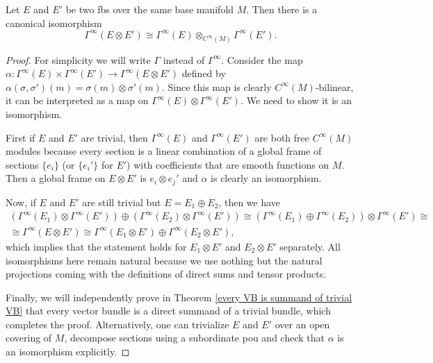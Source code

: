 \begin{prop}\label{sections of tensor products}
    Let $E$ and $E'$ be two \glspl{fb} over the same base manifold $M$. Then there is a canonical isomorphism
    \[\Gamma^\infty(E\otimes E')\cong \Gamma^\infty(E)\otimes_{C^\infty(M)}\Gamma^\infty(E').\]
\end{prop}
\begin{proof}
    For simplicity we will write $\Gamma$ instead of $\Gamma^\infty$. Consider the map $\alpha:\Gamma^\infty(E)\times\Gamma^\infty(E')\to\Gamma^\infty(E\otimes E')$ defined by $\alpha(\sigma,\sigma')(m)=\sigma(m)\otimes\sigma'(m)$. Since this map is clearly $C^\infty(M)$-bilinear, it can be interpreted as a map on $\Gamma^\infty(E)\otimes\Gamma^\infty(E')$. We need to show it is an isomorphism.
    
    First if $E$ and $E'$ are trivial, then $\Gamma^\infty(E)$ and $\Gamma^\infty(E')$ are both free $C^\infty(M)$ modules because every section is a linear combination of a global frame of sections $\{e_i\}$ (or $\{e_i'\}$ for $E'$) with coefficients that are smooth functions on $M$. Then a global frame on $E\otimes E'$ is $e_i\otimes e_j'$ and $\alpha$ is clearly an isomorphism.
    
    Now, if $E$ and $E'$ are still trivial but $E=E_1\oplus E_2$, then we have 
    \begin{multline}
        (\Gamma^\infty(E_1)\otimes\Gamma^\infty(E'))\oplus(\Gamma^\infty(E_2)\otimes\Gamma^\infty(E'))\cong (\Gamma^\infty(E_1)\oplus\Gamma^\infty(E_2))\otimes\Gamma^\infty(E')\cong\\ \cong \Gamma^\infty(E\otimes E')\cong \Gamma^\infty(E_1\otimes E')\oplus\Gamma^\infty(E_2\otimes E'),
    \end{multline}
    which implies that the statement holds for $E_1\otimes E'$ and $E_2\otimes E'$ separately. All isomorphisms here remain natural because we use nothing but the natural projections coming with the definitions of direct sums and tensor products.
    
    Finally, we will independently prove in Theorem \ref{every VB is summand of trivial VB} that every vector bundle is a direct summand of a trivial bundle, which completes the proof. Alternatively, one can trivialize $E$ and $E'$ over an open covering of $M$, decompose sections using a subordinate \gls{pou} and check that $\alpha$ is an isomorphism explicitly.
\end{proof}



